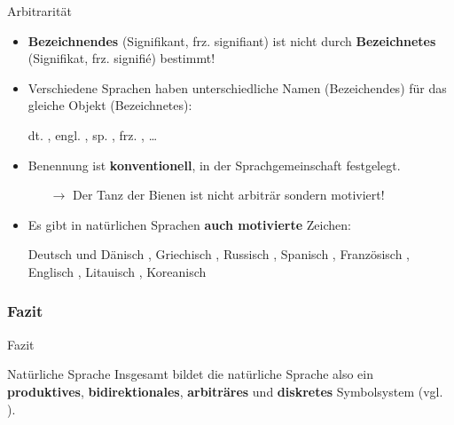 \begin{frame}{Arbitrarität}

\begin{itemize}
	\item<1-> \textbf{Bezeichnendes} (Signifikant, frz. signifiant) ist nicht durch \textbf{Bezeichnetes} (Signifikat, frz. signifié) bestimmt!
	\item[]
	\item<2-> Verschiedene Sprachen haben unterschiedliche Namen (Bezeichendes) für das gleiche Objekt (Bezeichnetes):

\pause

\ea dt. , engl. , sp. , frz. , \ldots
\z

\pause 

	\item Benennung ist \textbf{konventionell}, \dash in der Sprachgemeinschaft festgelegt.

	\begin{itemize}
		\item[$\rightarrow$] Der Tanz der Bienen ist nicht arbiträr sondern motiviert!
	\end{itemize}

\pause
		
	\item Es gibt in natürlichen Sprachen \textbf{auch motivierte} Zeichen:

\ea Deutsch und Dänisch , Griechisch , Russisch , Spanisch , Französisch , Englisch , Litauisch , Koreanisch 
\z

\end{itemize}

\end{frame}


\subsubsection{Fazit}
\begin{frame}{Fazit}
		
	\begin{block}{Natürliche Sprache}
			Insgesamt bildet die natürliche Sprache also ein \textbf{produktives}, \textbf{bidirektionales}, \textbf{arbiträres} und \textbf{diskretes} Symbolsystem (vgl. \citet{Luedeling2009a}).
	\end{block}

\end{frame}	
